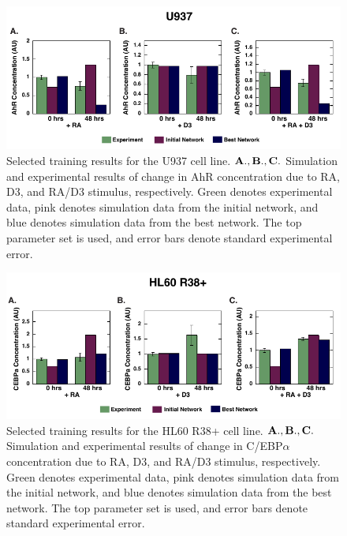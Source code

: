\documentclass[12pt]{article}
\begin{document}
\clearpage

\vspace{10mm}

\clearpage

\clearpage

\clearpage

\clearpage

\clearpage

\begin{figure}\centering
\includegraphics[width=1.0\textwidth]{./figs_chp3/Cell_Line_New/U937_Experiment_9.pdf}
\caption{Selected training results for the U937 cell line. $\bf{A., B., C.}$ Simulation and experimental results of change in AhR concentration due to RA, D3, and RA/D3 stimulus, respectively. Green denotes experimental data, pink denotes simulation data from the initial network, and blue denotes simulation data from the best network. The top parameter set is used, and error bars denote standard experimental error.}
\label{fg:U937_Experiment}
\end{figure}
\clearpage

\begin{figure}\centering
\includegraphics[width=1.0\textwidth]{./figs_chp3/Cell_Line_New/R38+HL60_Experiment_1.pdf}
\caption{Selected training results for the HL60 R38+ cell line. $\bf{A., B., C.}$ Simulation and experimental results of change in C/EBP$\alpha$ concentration due to RA, D3, and RA/D3 stimulus, respectively. Green denotes experimental data, pink denotes simulation data from the initial network, and blue denotes simulation data from the best network. The top parameter set is used, and error bars denote standard experimental error.}
\label{fg:R38+HL60_Experiment}
\end{figure}
\clearpage
\end{document}
